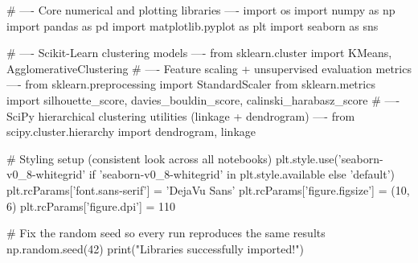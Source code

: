 
\begin{codebox}[title={Core numerical and plotting libraries}]
# ---- Core numerical and plotting libraries ----
import os
import numpy as np
import pandas as pd
import matplotlib.pyplot as plt
import seaborn as sns


# ---- Scikit-Learn clustering models ----
from sklearn.cluster import KMeans, AgglomerativeClustering
# ---- Feature scaling + unsupervised evaluation metrics ----
from sklearn.preprocessing import StandardScaler
from sklearn.metrics import silhouette_score, davies_bouldin_score, calinski_harabasz_score
# ---- SciPy hierarchical clustering utilities (linkage + dendrogram) ----
from scipy.cluster.hierarchy import dendrogram, linkage

# Styling setup (consistent look across all notebooks)
plt.style.use('seaborn-v0_8-whitegrid' if 'seaborn-v0_8-whitegrid' in plt.style.available else 'default')
plt.rcParams['font.sans-serif'] = 'DejaVu Sans'
plt.rcParams['figure.figsize'] = (10, 6)
plt.rcParams['figure.dpi'] = 110

# Fix the random seed so every run reproduces the same results
np.random.seed(42)
print("Libraries successfully imported!")
\end{codebox}


